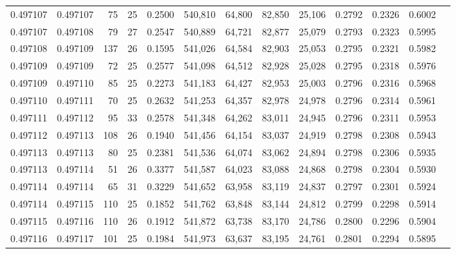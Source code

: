 \begin{tabular}{rrrrrrrrrrrrr}
0.497107 & 0.497107 &  75 &  25 &                                     0.2500 & 540,810 &  64,800 &  82,850 &  25,106 & 0.2792 & 0.2326 & 0.6002 \\
0.497107 & 0.497108 &  79 &  27 &                                     0.2547 & 540,889 &  64,721 &  82,877 &  25,079 & 0.2793 & 0.2323 & 0.5995 \\
0.497108 & 0.497109 & 137 &  26 &                                     0.1595 & 541,026 &  64,584 &  82,903 &  25,053 & 0.2795 & 0.2321 & 0.5982 \\
0.497109 & 0.497109 &  72 &  25 &                                     0.2577 & 541,098 &  64,512 &  82,928 &  25,028 & 0.2795 & 0.2318 & 0.5976 \\
0.497109 & 0.497110 &  85 &  25 &                                     0.2273 & 541,183 &  64,427 &  82,953 &  25,003 & 0.2796 & 0.2316 & 0.5968 \\
0.497110 & 0.497111 &  70 &  25 &                                     0.2632 & 541,253 &  64,357 &  82,978 &  24,978 & 0.2796 & 0.2314 & 0.5961 \\
0.497111 & 0.497112 &  95 &  33 &                                     0.2578 & 541,348 &  64,262 &  83,011 &  24,945 & 0.2796 & 0.2311 & 0.5953 \\
0.497112 & 0.497113 & 108 &  26 &                                     0.1940 & 541,456 &  64,154 &  83,037 &  24,919 & 0.2798 & 0.2308 & 0.5943 \\
0.497113 & 0.497113 &  80 &  25 &                                     0.2381 & 541,536 &  64,074 &  83,062 &  24,894 & 0.2798 & 0.2306 & 0.5935 \\
0.497113 & 0.497114 &  51 &  26 &                                     0.3377 & 541,587 &  64,023 &  83,088 &  24,868 & 0.2798 & 0.2304 & 0.5930 \\
0.497114 & 0.497114 &  65 &  31 &                                     0.3229 & 541,652 &  63,958 &  83,119 &  24,837 & 0.2797 & 0.2301 & 0.5924 \\
0.497114 & 0.497115 & 110 &  25 &                                     0.1852 & 541,762 &  63,848 &  83,144 &  24,812 & 0.2799 & 0.2298 & 0.5914 \\
0.497115 & 0.497116 & 110 &  26 &                                     0.1912 & 541,872 &  63,738 &  83,170 &  24,786 & 0.2800 & 0.2296 & 0.5904 \\
0.497116 & 0.497117 & 101 &  25 &                                     0.1984 & 541,973 &  63,637 &  83,195 &  24,761 & 0.2801 & 0.2294 & 0.5895 \\

\end{tabular}
